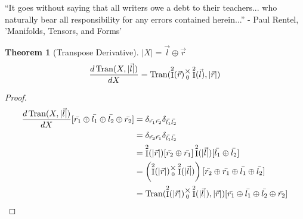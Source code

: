 \documentclass[12pt]{book}
\theoremstyle{plain}
\newtheorem{theorem}{Theorem}[chapter]
\theoremstyle{definition}
\theoremstyle{ppart}
\theoremstyle{case}
\theoremstyle{solution}
\DeclareMathOperator{\Ident}{I}
\DeclareMathOperator{\Tran}{Tran}
\newcommand{\mmult}[1]{\text{\raisebox{1ex}{$\underset{#1}{\times}$}}}
\begin{document}
\begin{displayquote}
``It goes without saying that all writers owe a debt to their teachers... who
naturally bear all responsibility for any errors contained herein...''
- Paul Rentel, 'Manifolds, Tensors, and Forms'
\end{displayquote}

\begin{theorem}[Transpose Derivative]
\label{tran_derivative}
$|X| = \vec{l} \oplus \vec{r}$
\[
 \frac{d\Tran(X, |\vec{l}|)}{dX} =
 \Tran(\Ident^2(\vec{r}) \mmult{0} \Ident^2(\vec{l}), |\vec{r}|)
\]
\end{theorem}
\begin{proof}
\begin{align*}
 \frac{d\Tran(X, |\vec{l}|)}{dX}
 [\bar{r_1} \oplus \bar{l_1} \oplus \bar{l_2} \oplus \bar{r_2}]
 &= \delta_{\bar{r_1}\bar{r_2}} \delta_{\bar{l_1}\bar{l_2}} \\
 &= \delta_{\bar{r_2}\bar{r_1}} \delta_{\bar{l_1}\bar{l_2}} \\
 &=
  \Ident^2(|\vec{r}|)[\bar{r_2}\oplus\bar{r_1}]
  \Ident^2(|\vec{l}|)[\bar{l_1}\oplus\bar{l_2}] \\
 &=
   \left(
    \Ident^2(|\vec{r}|)
    \mmult{0}
    \Ident^2(|\vec{l}|)
  \right)
  [\bar{r_2}\oplus\bar{r_1}\oplus\bar{l_1}\oplus\bar{l_2}] \\
 &=
  \Tran(
    \Ident^2(|\vec{r}|)
    \mmult{0}
    \Ident^2(|\vec{l}|)
  , |\vec{r}|) 
 [\bar{r_1} \oplus \bar{l_1} \oplus \bar{l_2} \oplus \bar{r_2}]
\end{align*}
\end{proof}
\end{document}
